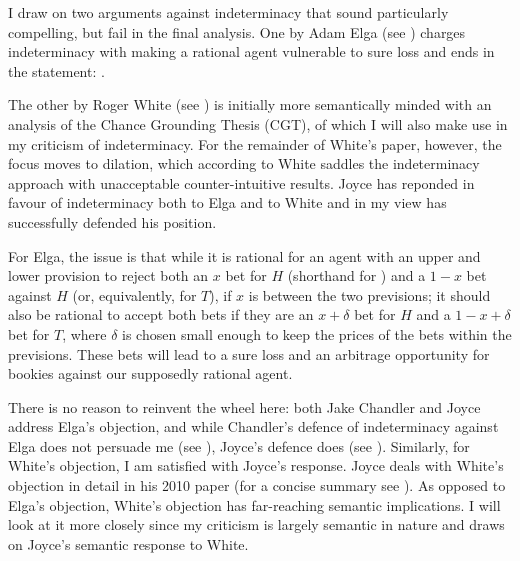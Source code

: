 I draw on two arguments against indeterminacy that
sound particularly compelling, but fail in the final
analysis. One by Adam Elga (see )
charges indeterminacy with making a rational agent
vulnerable to sure loss and ends in the statement:
 .

The other by Roger White (see ) is
initially more semantically minded with an analysis of
the Chance Grounding Thesis (CGT), of which I will also
make use in my criticism of indeterminacy. For the
remainder of White's paper, however, the focus moves to
dilation, which according to White saddles the
indeterminacy approach with unacceptable
counter-intuitive results. Joyce has reponded in favour
of indeterminacy both to Elga and to White and in my
view has successfully defended his position.

For Elga, the issue is that while it is rational for an
agent with an upper and lower provision to reject both
an $x$ bet for $H$ (shorthand for ) and a $1-x$ bet
against $H$ (or, equivalently, for $T$), if $x$ is
between the two previsions; it should also be rational
to accept both bets if they are an $x+\delta$ bet for
$H$ and a $1-x+\delta$ bet for $T$, where $\delta$ is
chosen small enough to keep the prices of the bets
within the previsions. These bets will lead to a sure
loss and an arbitrage opportunity for bookies against
our supposedly rational agent.

There is no reason to reinvent the wheel here: both
Jake Chandler and Joyce address Elga's objection, and
while Chandler's defence of indeterminacy against Elga
does not persuade me (see ),
Joyce's defence does (see ).
Similarly, for White's objection, I am satisfied with
Joyce's response. Joyce deals with White's objection in
detail in his 2010 paper (for a concise summary see
). As opposed to Elga's
objection, White's objection has far-reaching semantic
implications. I will look at it more closely since my
criticism is largely semantic in nature and draws on
Joyce's semantic response to White.

